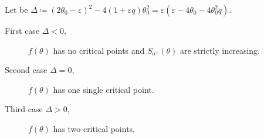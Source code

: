 \documentclass[
    8pt,
    aspectratio=1610,
    c,
    intlimits,
    leqno,
    professionalfonts,
]{beamer}
\begin{document}
\begin{frame}
	Let be
	\begin{math}
		\Delta\coloneqq
		{\left(2\theta_{0}-\varepsilon\right)}^{2}-4\left(1+\varepsilon q\right)\theta_{0}^{2}=
		\varepsilon\left(\varepsilon-4\theta_{0}-4\theta_{0}^{2}q\right)
	\end{math}.

	\begin{description}
		\item[First case $\Delta<0$,]

		      $f\left(\theta\right)$ has no critical points and
		      $S_{\text{o}^{\pm}}\left(\theta\right)$ are strictly increasing.

		\item[Second case $\Delta=0$,]

		      $f\left(\theta\right)$ has one single critical point.

		\item[Third case $\Delta>0$,]

		      $f\left(\theta\right)$ has two critical points.
	\end{description}
\end{frame}
\end{document}
